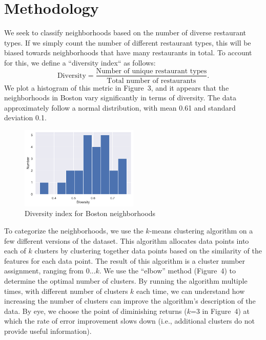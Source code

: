 \documentclass[11pt, a4paper]{article} %
\begin{document}
\section{Methodology}

We seek to classify neighborhoods based on the number of diverse restaurant types.
If we simply count the number of different restaurant types, this will be biased towards neighborhoods that have many restaurants in total.
To account for this, we define a ``diversity index`` as follows:
$$
\text{Diversity} = \frac{\text{Number of unique restaurant types}}{\text{Total number of restaurants}}.
$$
We plot a histogram of this metric in Figure~3, and it appears that the neighborhoods in Boston vary significantly in terms of diversity.
The data approximately follow a normal distribution, with mean 0.61 and standard deviation 0.1.

\begin{figure}
\begin{center}
\includegraphics[width=0.5\textwidth]{diversity_hist.pdf}
\end{center}
\caption{Diversity index for Boston neighborhoods}
\end{figure}

To categorize the neighborhoods, we use the $k$-means clustering algorithm on a few different versions of the dataset.
This algorithm allocates data points into each of $k$ clusters by clustering together data points based on the similarity of the features for each data point.
The result of this algorithm is a cluster number assignment, ranging from $0...k$. 
We use the ``elbow'' method (Figure~4) to determine the optimal number of clusters.
By running the algorithm multiple times, with different number of clusters $k$ each time, we can understand how increasing the number of clusters can improve the algorithm's description of the data.
By eye, we choose the point of diminishing returns ($k$=3 in Figure~4) at which the rate of error improvement slows down (i.e., additional clusters do not provide useful information).
\end{document}
